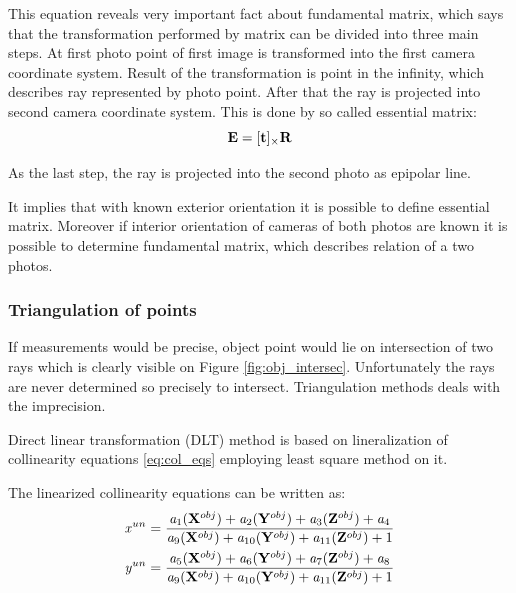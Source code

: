 \documentclass[a4paper,12pt]{article}
\newcommand{\ematr}[1]{
{\bf #1}
}
\newcommand{\evect}[1]{
{\bf #1}
}
\newcommand{\escal}[1]{
{\it #1}
}
\begin{document}
This equation reveals very important fact about fundamental matrix, which says that the transformation performed 
by matrix can be divided into three main steps.
At first photo point of first image is transformed into the first camera coordinate system. Result of the transformation is 
point in the infinity, which describes ray represented by photo point. 
After that the ray is projected into second camera coordinate system. This is done by so called essential matrix:
\begin{equation}
	 \ematr{E}  = [\evect{t}]_{\times} \ematr{R}
\end{equation}


As the last step, the ray is projected into the second photo as epipolar line.


It implies that with known exterior orientation it is possible to define essential matrix. 
Moreover if interior orientation of cameras of both photos are known it is possible to determine fundamental matrix,
which describes relation of a two photos.

\subsubsection{Triangulation of points}
\label{eq:triang}

If measurements would be precise, object point 
would lie on intersection of two rays which is clearly visible on 
 Figure \ref{fig:obj_intersec}. Unfortunately the rays are never determined so precisely to intersect.
Triangulation methods deals with the imprecision.  

Direct linear transformation (DLT) method  is based 
on lineralization of collinearity equations \eqref{eq:col_eqs}
employing least square method on it.

The linearized collinearity equations can be written as:  
\begin{equation}
\label{eq:col_eqs}
\begin{split}
&\escal{x}^{un} = \frac{\escal{a}_{1}(\evect{X}^{obj}) + 
                                  \escal{a}_{2}(\evect{Y}^{obj}) + 
                                  \escal{a}_{3}(\evect{Z}^{obj}) +
                                  \escal{a}_{4}
                                  }{
				  \escal{a}_{9}(\evect{X}^{obj}) + 
                                  \escal{a}_{10}(\evect{Y}^{obj}) + 
                                  \escal{a}_{11}(\evect{Z}^{obj}) +
                                   1  
                                  } \\
&\escal{y}^{un} = \frac{\escal{a}_{5}(\evect{X}^{obj}) + 
                                  \escal{a}_{6}(\evect{Y}^{obj}) + 
                                  \escal{a}_{7}(\evect{Z}^{obj}) +                                 
                                  \escal{a}_{8}
                                  }{
				  \escal{a}_{9}(\evect{X}^{obj}) + 
                                  \escal{a}_{10}(\evect{Y}^{obj}) + 
                                  \escal{a}_{11}(\evect{Z}^{obj}) +    
                                  1
                                  }
\end{split}
\end{equation}
 
\end{document}
